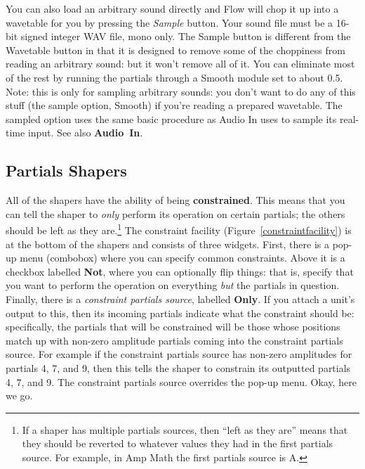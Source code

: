\documentclass{article}
\begin{document}
You can also load an arbitrary sound directly and Flow will chop it up into a wavetable for you by pressing the {\it Sample} button.  Your sound file must be a 16-bit signed integer WAV file, mono only.   The Sample button is different from the Wavetable button in that it is designed to remove some of the choppiness from reading an arbitrary sound: but it won't remove all of it.  You can eliminate most of the rest by running the partials through a Smooth module set to about 0.5.  Note: this is only for sampling arbitrary sounds:  you don't want to do any of this stuff (the sample option, Smooth) if you're reading a prepared wavetable.  The sampled option uses the same basic procedure as Audio In uses to sample its real-time input.  See also {\bf Audio~In}.


\subsection{Partials Shapers}
\label{unitshapers}


All of the shapers have the ability of being {\bf constrained}.  This means that you can tell the shaper to {\it only} perform its operation on certain partials; the others should be left as they are.\footnote{If a shaper has multiple partials sources, then ``left as they are'' means that they should be reverted to whatever values they had in the first partials source.  For example, in Amp Math the first partials source is A.}  The constraint facility (Figure~\ref{constraintfacility}) is at the bottom of the shapers and consists of three widgets.  First, there is a pop-up menu (combobox) where you can specify common constraints.  Above it is a checkbox labelled {\bf Not}, where you can optionally flip things: that is, specify that you want to perform the operation on everything {\it but} the partials in question.  Finally, there is a {\it constraint partials source}, labelled {\bf Only}. If you attach a unit's output to this, then its incoming partials indicate what the constraint should be: specifically, the partials that will be constrained will be those whose positions match up with non-zero amplitude partials coming into the constraint partials source. For example if the constraint partials source has non-zero amplitudes for partials 4, 7, and 9, then this tells the shaper to constrain its outputted partials 4, 7, and 9.  The constraint partials source overrides the pop-up menu.  Okay, here we go.

\end{document}

